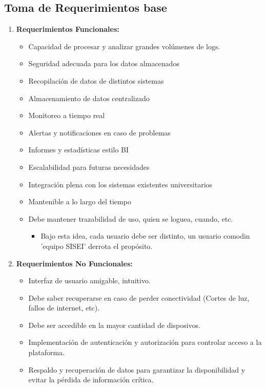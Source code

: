 \subsection{Toma de Requerimientos base}
\label{anexos:requerimientos}

\begin{enumerate}
  \item \textbf{Requerimientos Funcionales:} 
    \begin{itemize}
      \item Capacidad de procesar y analizar grandes volúmenes de logs.
      \item Seguridad adecuada para los datos almacenados
      \item Recopilación de datos de distintos sistemas
      \item Almacenamiento de datos centralizado
      \item Monitoreo a tiempo real
      \item Alertas y notificaciones en caso de problemas
      \item Informes y estadísticas estilo BI
      \item Escalabilidad para futuras necesidades
      \item Integración plena con los sistemas existentes universitarios
      \item Mantenible a lo largo del tiempo
      \item Debe mantener trazabilidad de uso, quien se loguea, cuando, etc.
        \begin{itemize}
          \item Bajo esta idea, cada usuario debe ser distinto, un usuario comodin 'equipo SISEI' derrota el propósito.
        \end{itemize}
    \end{itemize}
  \item \textbf{Requerimientos No Funcionales:} 
    \begin{itemize}
      \item Interfaz de usuario amigable, intuitivo.
      \item Debe saber recuperarse en caso de perder conectividad (Cortes de luz, fallos de internet, etc).
      \item Debe ser accedible en la mayor cantidad de disposivos.
      \item Implementación de autenticación y autorización para controlar acceso a la plataforma.
      \item Respaldo y recuperación de datos para garantizar la disponibilidad y evitar la pérdida de información crítica.
    \end{itemize}
\end{enumerate}


\clearpage

